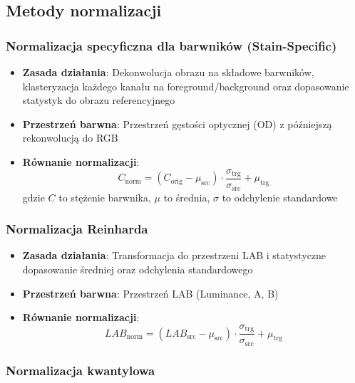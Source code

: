\documentclass{article}
\begin{document}
\subsection{Metody normalizacji}

\subsubsection{Normalizacja specyficzna dla barwników (Stain-Specific)}

\begin{itemize}
    \item \textbf{Zasada działania}: Dekonwolucja obrazu na składowe barwników, klasteryzacja każdego kanału na foreground/background oraz dopasowanie statystyk do obrazu referencyjnego
    \item \textbf{Przestrzeń barwna}: Przestrzeń gęstości optycznej (OD) z późniejszą rekonwolucją do RGB
    \item \textbf{Równanie normalizacji}:
    \begin{equation}
        C_{\text{norm}} = (C_{\text{orig}} - \mu_{\text{src}}) \cdot \frac{\sigma_{\text{trg}}}{\sigma_{\text{src}}} + \mu_{\text{trg}}
    \end{equation}
    gdzie $C$ to stężenie barwnika, $\mu$ to średnia, $\sigma$ to odchylenie standardowe
\end{itemize}

\subsubsection{Normalizacja Reinharda}

\begin{itemize}
    \item \textbf{Zasada działania}: Transformacja do przestrzeni LAB i statystyczne dopasowanie średniej oraz odchylenia standardowego
    \item \textbf{Przestrzeń barwna}: Przestrzeń LAB (Luminance, A, B)
    \item \textbf{Równanie normalizacji}:
    \begin{equation}
        LAB_{\text{norm}} = (LAB_{\text{src}} - \mu_{\text{src}}) \cdot \frac{\sigma_{\text{trg}}}{\sigma_{\text{src}}} + \mu_{\text{trg}}
    \end{equation}
\end{itemize}

\subsubsection{Normalizacja kwantylowa}
\end{document}
